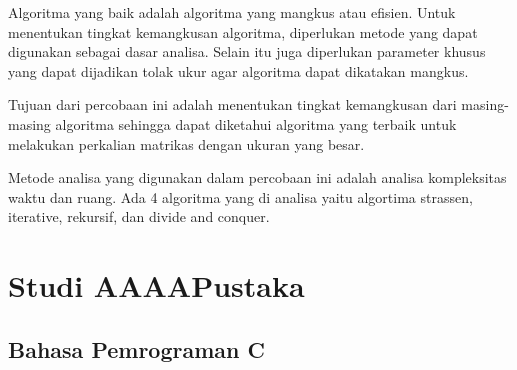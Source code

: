 \documentclass[conference]{IEEEtran}
\begin{document}
Algoritma yang baik adalah algoritma yang mangkus atau efisien. Untuk menentukan tingkat kemangkusan algoritma, diperlukan metode yang dapat digunakan sebagai dasar analisa. Selain itu juga diperlukan parameter khusus yang dapat dijadikan tolak ukur agar algoritma dapat dikatakan mangkus. 

Tujuan dari percobaan ini adalah menentukan tingkat kemangkusan dari masing-masing algoritma sehingga dapat diketahui algoritma yang terbaik untuk melakukan perkalian matrikas dengan ukuran yang besar.

Metode analisa yang digunakan dalam percobaan ini adalah analisa kompleksitas waktu dan ruang. Ada 4 algoritma yang di analisa yaitu algortima strassen, iterative, rekursif, dan divide and conquer.

\section{Studi AAAAPustaka}

\subsection{Bahasa Pemrograman C}
\end{document}
